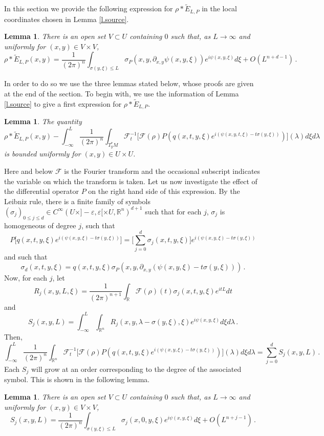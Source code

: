 \documentclass[10pt,twoside]{article}
\newcommand{\fou}{\mathcal{F}}
\newcommand{\eps}{\varepsilon}
\newcommand{\R}{\mathbb{R}}
\numberwithin{theorem}{section}
\newtheorem{lemma}[theorem]{Lemma}
\begin{document}
In this section we provide the following expression for $\rho*\tilde{E}_{L,P}$ in the local coordinates chosen in Lemma \ref{l.source}.
\begin{lemma}\label{hol0}
There is an open set $V\subset U$ containing $0$ such that, as $L\rightarrow\infty$ and uniformly for $(x,y)\in V\times V$,
\[\rho*\tilde{E}_{L,P}(x,y) = \frac{1}{(2\pi)^n}\int_{\sigma(y,\xi)\leq L} \sigma_P(x,y,\partial_{x,y}\psi(x,y,\xi)) e^{i\psi(x,y,\xi)}d\xi + O(L^{n+d-1})\,.\]
\end{lemma}
In order to do so we use the three lemmas stated below, whose proofs are given at the end of the section. To begin with, we use the information of Lemma \ref{l.source} to give a first expression for $\rho*\tilde{E}_{L,P}$.
\begin{lemma}\label{hol1}
The quantity
\[\rho*\tilde{E}_{L,P}(x,y)-\int_{-\infty}^L\frac{1}{(2\pi)^n}\int_{T^*_yM} \fou^{-1}_t\Big[\fou(\rho)P\left(q(x,t,y,\xi)e^{i(\psi(x,y,t,\xi)-t \sigma(y,\xi))}\right)\Big](\lambda)d\xi d\lambda\]
is bounded uniformly for $(x,y)\in U\times U$.
\end{lemma}
Here and below $\fou$ is the Fourier transform and the occasional subscript indicates the variable on which the transform is taken. Let us now investigate the effect of the differential operator $P$ on the right hand side of this expression. By the Leibniz rule, there is a finite family of symbols $(\sigma_j)_{0\leq j\leq d}\in C^{\infty}(U\times]-\eps,\eps[\times U,\R^n)^{d+1}$ such that for each $j$, $\sigma_j$ is homogeneous of degree $j$, such that
\[P\Big[q(x,t,y,\xi)e^{i(\psi(x,y,\xi)-t\sigma(y,\xi))}\Big]=\Big[\sum_{j=0}^{d} \sigma_j(x,t,y,\xi)\Big]e^{i(\psi(x,y,\xi)-t\sigma(y,\xi))}\]
and such that
\[\sigma_d(x,t,y,\xi)=q(x,t,y,\xi)\sigma_P(x,y,\partial_{x,y}(\psi(x,y,\xi)-t\sigma(y,\xi)))\,.\]
Now, for each $j$, let
\[R_j(x,y,L,\xi)=\frac{1}{(2\pi)^{n+1}}\int_{\R}\fou(\rho)(t)\sigma_j(x,t,y,\xi)e^{itL}dt\]
and
\[S_j(x,y,L)=\int_{-\infty}^L\int_{\R^n} R_j(x,y,\lambda-\sigma(y,\xi),\xi)e^{i\psi(x,y,\xi)}d\xi d\lambda\,.\]
Then,
\[\int_{-\infty}^L\frac{1}{(2\pi)^n}\int_{\R^n} \fou^{-1}_t\Big[\fou(\rho)P\left(q(x,t,y,\xi)e^{i(\psi(x,y,\xi)-t \sigma(y,\xi))}\right)\Big](\lambda)d\xi d\lambda=\sum_{j=0}^dS_j(x,y,L)\,.\]
Each $S_j$ will grow at an order corresponding to the degree of the associated symbol. This is shown in the following lemma.
\begin{lemma}\label{hol3}
There is an open set $V\subset U$ containing $0$ such that, as $L\rightarrow\infty$ and uniformly for $(x,y)\in V\times V$,
\[S_j(x,y,L)=\frac{1}{(2\pi)^n}\int_{\sigma(y,\xi)\leq L}\sigma_j(x,0,y,\xi)e^{i\psi(x,y,\xi)}d\xi+O(L^{n+j-1})\,.\]
\end{lemma}
\end{document}
